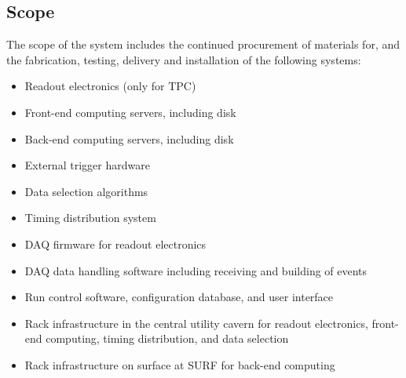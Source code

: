 




\subsection{Scope}
\label{sec:fdsp-daq-scope}


The scope of the  system includes the continued procurement
of materials for, and the fabrication, testing, delivery and
installation of the following systems:

\begin{itemize}
\item Readout electronics (only for TPC)
\item Front-end computing servers, including disk 
\item Back-end computing servers, including disk
\item External trigger hardware 
\item Data selection algorithms
\item Timing distribution system
\item DAQ firmware for readout electronics
\item DAQ data handling software including receiving and building of
  events
\item Run control software, configuration database, and user interface
\item Rack infrastructure in the central utility cavern for readout
  electronics, front-end computing, timing distribution, and data
  selection
\item Rack infrastructure on surface at SURF for back-end computing
\end{itemize}


